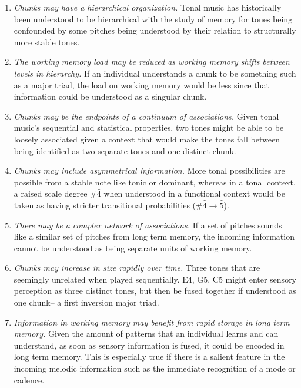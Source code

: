 \documentclass[12pt,]{book}
\providecommand{\tightlist}{%
  \setlength{\itemsep}{0pt}\setlength{\parskip}{0pt}}
\begin{document}
\begin{enumerate}
\def\labelenumi{\arabic{enumi}.}
\tightlist
\item
  \emph{Chunks may have a hierarchical organization.} Tonal music has historically been understood to be hierarchical \citep{krumhanslCognitiveFoundationsMusical2001, meyerEmotionMeaningMusic1956, schenkerFreieSatz1935} with the study of memory for tones being confounded by some pitches being understood by their relation to structurally more stable tones.
\item
  \emph{The working memory load may be reduced as working memory shifts between levels in hierarchy.} If an individual understands a chunk to be something such as a major triad, the load on working memory would be less since that information could be understood as a singular chunk.
\item
  \emph{Chunks may be the endpoints of a continuum of associations.} Given tonal music's sequential and statistical properties, two tones might be able to be loosely associated given a context that would make the tones fall between being identified as two separate tones and one distinct chunk.
\item
  \emph{Chunks may include asymmetrical information.} More tonal possibilities are possible from a stable note like tonic or dominant, whereas in a tonal context, a raised scale degree \#\(\hat{4}\) when understood in a functional context would be taken as having stricter transitional probabilities (\#\(\hat{4} \rightarrow \hat{5}\)).
\item
  \emph{There may be a complex network of associations.} If a set of pitches sounds like a similar set of pitches from long term memory, the incoming information cannot be understood as being separate units of working memory.
\item
  \emph{Chunks may increase in size rapidly over time.} Three tones that are seemingly unrelated when played sequentially. E4, G5, C5 might enter sensory perception as three distinct tones, but then be fused together if understood as one chunk-- a first inversion major triad.
\item
  \emph{Information in working memory may benefit from rapid storage in long term memory.} Given the amount of patterns that an individual learns and can understand, as soon as sensory information is fused, it could be encoded in long term memory. This is especially true if there is a salient feature in the incoming melodic information such as the immediate recognition of a mode or cadence.
\end{enumerate}
\end{document}
